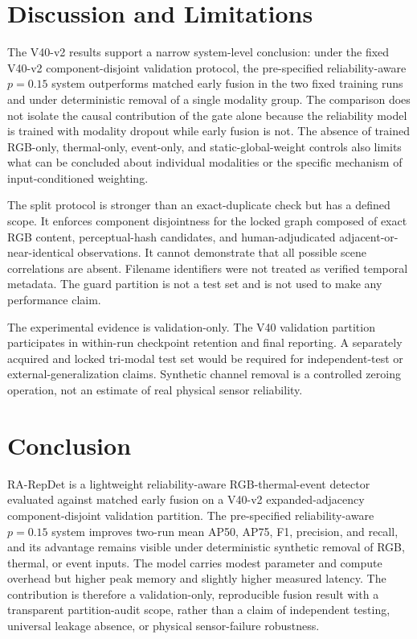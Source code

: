\section{Discussion and Limitations}
The V40-v2 results support a narrow system-level conclusion: under the fixed V40-v2 component-disjoint validation protocol, the pre-specified reliability-aware $p=0.15$ system outperforms matched early fusion in the two fixed training runs and under deterministic removal of a single modality group. The comparison does not isolate the causal contribution of the gate alone because the reliability model is trained with modality dropout while early fusion is not. The absence of trained RGB-only, thermal-only, event-only, and static-global-weight controls also limits what can be concluded about individual modalities or the specific mechanism of input-conditioned weighting.

The split protocol is stronger than an exact-duplicate check but has a defined scope. It enforces component disjointness for the locked graph composed of exact RGB content, perceptual-hash candidates, and human-adjudicated adjacent-or-near-identical observations. It cannot demonstrate that all possible scene correlations are absent. Filename identifiers were not treated as verified temporal metadata. The guard partition is not a test set and is not used to make any performance claim.

The experimental evidence is validation-only. The V40 validation partition participates in within-run checkpoint retention and final reporting. A separately acquired and locked tri-modal test set would be required for independent-test or external-generalization claims. Synthetic channel removal is a controlled zeroing operation, not an estimate of real physical sensor reliability.

\section{Conclusion}
RA-RepDet is a lightweight reliability-aware RGB-thermal-event detector evaluated against matched early fusion on a V40-v2 expanded-adjacency component-disjoint validation partition. The pre-specified reliability-aware $p=0.15$ system improves two-run mean AP50, AP75, F1, precision, and recall, and its advantage remains visible under deterministic synthetic removal of RGB, thermal, or event inputs. The model carries modest parameter and compute overhead but higher peak memory and slightly higher measured latency. The contribution is therefore a validation-only, reproducible fusion result with a transparent partition-audit scope, rather than a claim of independent testing, universal leakage absence, or physical sensor-failure robustness.
